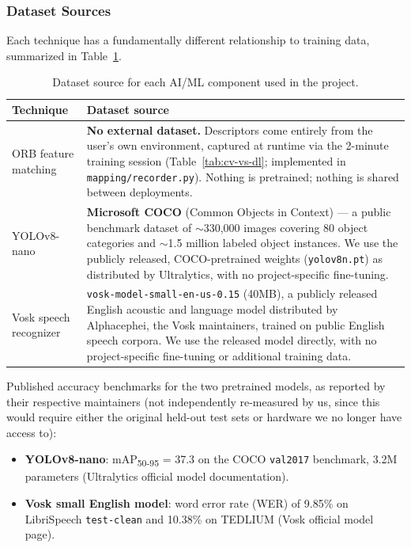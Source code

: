 \documentclass[12pt,a4paper]{article}
\begin{document}
\subsubsection{Dataset Sources}
\label{sec:datasets}
Each technique has a fundamentally different relationship to training data, summarized in Table~\ref{tab:datasets}.

\begin{table}[H]
\centering
\begin{tabularx}{\textwidth}{l X}
\toprule
\textbf{Technique} & \textbf{Dataset source} \\
\midrule
ORB feature matching & \textbf{No external dataset.} Descriptors come entirely from the user's own environment, captured at runtime via the 2-minute training session (Table~\ref{tab:cv-vs-dl}; implemented in \texttt{mapping/recorder.py}). Nothing is pretrained; nothing is shared between deployments. \\
YOLOv8-nano & \textbf{Microsoft COCO} (Common Objects in Context) — a public benchmark dataset of $\sim$330{,}000 images covering 80 object categories and $\sim$1.5 million labeled object instances. We use the publicly released, COCO-pretrained weights (\texttt{yolov8n.pt}) as distributed by Ultralytics, with no project-specific fine-tuning. \\
Vosk speech recognizer & \texttt{vosk-model-small-en-us-0.15} (40MB), a publicly released English acoustic and language model distributed by Alphacephei, the Vosk maintainers, trained on public English speech corpora. We use the released model directly, with no project-specific fine-tuning or additional training data. \\
\bottomrule
\end{tabularx}
\caption{Dataset source for each AI/ML component used in the project.}
\label{tab:datasets}
\end{table}

\noindent Published accuracy benchmarks for the two pretrained models, as reported by their respective maintainers (not independently re-measured by us, since this would require either the original held-out test sets or hardware we no longer have access to):

\begin{itemize}[leftmargin=1.4cm]
  \item \textbf{YOLOv8-nano}: mAP\textsubscript{50-95} = 37.3 on the COCO \texttt{val2017} benchmark, 3.2M parameters (Ultralytics official model documentation).
  \item \textbf{Vosk small English model}: word error rate (WER) of 9.85\% on LibriSpeech \texttt{test-clean} and 10.38\% on TEDLIUM (Vosk official model page).
\end{itemize}
\end{document}
